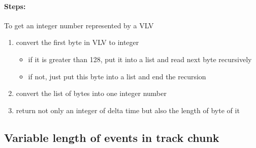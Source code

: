 \documentclass[12.5pt]{scrartcl}
\begin{document}
\paragraph{Steps:}
To get an integer number represented by a VLV
\begin{enumerate}
    \item convert the first byte in VLV to integer
        \begin{itemize}
            \item if it is greater than 128, put it into a list and read next byte recursively
            \item if not, just put this byte into a list and end the recursion
        \end{itemize}
    \item convert the list of bytes into one integer number
    \item return not only an integer of delta time but also the length of byte of it
\end{enumerate}

\subsection{Variable length of events in track chunk}
\end{document}
